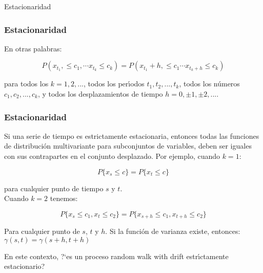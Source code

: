 \documentclass[xcolor=(list of options)]{beamer}
\begin{document}
\begin{section}{Estacionaridad}
\begin{frame}
\frametitle{Estacionaridad}

En otras palabras:

\begin{equation*}
P(x_{t_1},\le c_1, \cdots x_{t_k} \le c_k) = P(x_{t_1}+h,\le c_1\cdots x_{t_k+h} \le c_k)
\end{equation*}

para todos los $k = 1,2, ...$, todos los per\'\i{}odos $t_1, t_2, ..., t_k$, todos los n\'umeros $c_1, c_2, ..., c_k$, y todos los desplazamientos de tiempo $h = 0, \pm 1, \pm 2 , ....$

\end{frame}

\begin{frame}
\frametitle{Estacionaridad}

Si una serie de tiempo es estrictamente estacionaria, entonces todas las funciones de distribuci\'on multivariante para subconjuntos de variables, deben ser iguales con sus contrapartes en el conjunto desplazado. Por ejemplo, cuando $k = 1$:

\begin{equation*}
P \{x_s \le c\} = P \{x_t \le c\}
\end{equation*}

para cualquier punto de tiempo $s$ y $t$. \\

Cuando $k=2$ tenemos:

\begin{equation*}
P \{x_s \le c_1, x_t \le  c_2\} = P \{x_{s+h} \le c_1, x_{t+h} \le  c_2\} 
\end{equation*}

Para cualquier punto de $s$, $t$ y $h$. Si la funci\'on de varianza existe, entonces: $\gamma(s,t)=\gamma(s+h,t+h)$

En este contexto, ?`es un proceso random walk with drift estr\'\i{}ctamente estacionario?

\end{frame}

\end{section}
\end{document}
